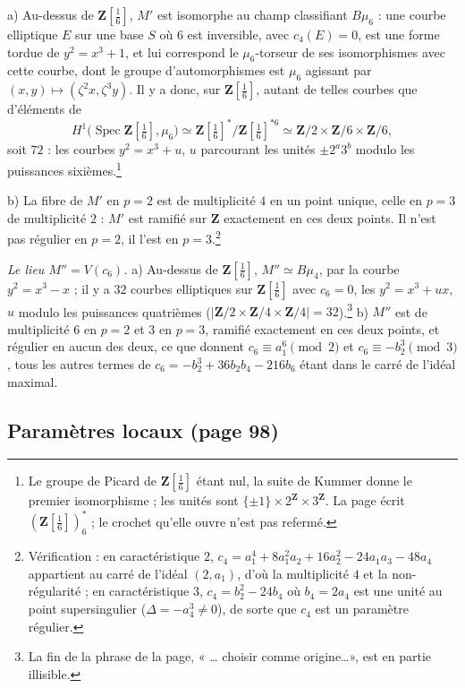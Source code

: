 \documentclass[11pt,a4paper]{article}
\begin{document}
a) Au-dessus de $\mathbf{Z}[\tfrac16]$, $M'$ est isomorphe au champ classifiant
$B\mu_6$ : une courbe elliptique $E$ sur une base $S$ où $6$ est inversible,
avec $c_4(E) = 0$, est une forme tordue de $y^2 = x^3 + 1$, et lui correspond
le $\mu_6$-torseur de ses isomorphismes avec cette courbe, dont le groupe
d'automorphismes est $\mu_6$ agissant par $(x,y) \mapsto (\zeta^2x,\zeta^3y)$.
Il y a donc, sur $\mathbf{Z}[\tfrac16]$, autant de telles courbes que
d'éléments de
\[
H^1\bigl(\operatorname{Spec}\mathbf{Z}[\tfrac16], \mu_6\bigr)
\simeq \mathbf{Z}[\tfrac16]^{*}/\mathbf{Z}[\tfrac16]^{*6}
\simeq \mathbf{Z}/2 \times \mathbf{Z}/6 \times \mathbf{Z}/6,
\]
soit $72$ : les courbes $y^2 = x^3 + u$, $u$ parcourant les unités $\pm
2^a3^b$ modulo les puissances sixièmes.\footnote{Le groupe de Picard de
$\mathbf{Z}[\tfrac16]$ étant nul, la suite de Kummer donne le premier
isomorphisme ; les unités sont $\{\pm 1\}\times 2^{\mathbf{Z}}\times
3^{\mathbf{Z}}$. La page écrit $(\mathbf{Z}[\tfrac16])^*_6$ ; le crochet
qu'elle ouvre n'est pas refermé.}

b) La fibre de $M'$ en $p = 2$ est de multiplicité $4$ en un point unique,
celle en $p = 3$ de multiplicité $2$ : $M'$ est ramifié sur $\mathbf{Z}$
exactement en ces deux points. Il n'est pas régulier en $p = 2$, il l'est en $p
= 3$.\footnote{Vérification : en caractéristique $2$, $c_4 = a_1^4 + 8a_1^2a_2
+ 16a_2^2 - 24a_1a_3 - 48a_4$ appartient au carré de l'idéal $(2, a_1)$,
d'où la multiplicité $4$ et la non-régularité ; en caractéristique $3$, $c_4 =
b_2^2 - 24b_4$ où $b_4 = 2a_4$ est une unité au point supersingulier
($\Delta = -a_4^3 \neq 0$), de sorte que $c_4$ est un paramètre régulier.}

\emph{Le lieu $M'' = V(c_6)$.} a) Au-dessus de $\mathbf{Z}[\tfrac16]$, $M''
\simeq B\mu_4$, par la courbe $y^2 = x^3 - x$ ; il y a $32$ courbes elliptiques
sur $\mathbf{Z}[\tfrac16]$ avec $c_6 = 0$, les $y^2 = x^3 + ux$, $u$ modulo
les puissances quatrièmes ($|\mathbf{Z}/2\times\mathbf{Z}/4\times\mathbf{Z}/4|
= 32$).\footnote{La fin de la phrase de la page, « \ldots{} choisir comme
origine\ldots », est en partie illisible.} b) $M''$ est de multiplicité $6$ en
$p = 2$ et $3$ en $p = 3$, ramifié exactement en ces deux points, et régulier
en aucun des deux, ce que donnent $c_6 \equiv a_1^6 \pmod 2$ et $c_6
\equiv -b_2^3 \pmod 3$, tous les autres termes de $c_6 = -b_2^3 + 36b_2b_4 -
216b_6$ étant dans le carré de l'idéal maximal.

\subsection*{Paramètres locaux (page 98)}
\end{document}
